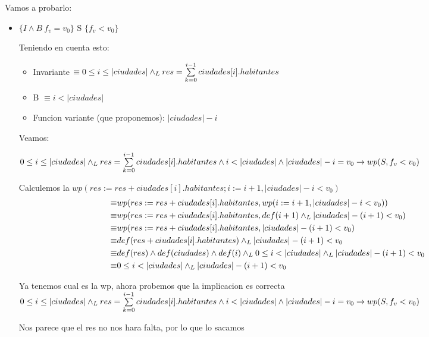 \documentclass[10pt,a4paper]{article}
\begin{document}
\begin {enumerate}
    Vamos a probarlo:

    \begin{itemize}
        \item 
            $\{ I \land B \ f_{v} = v_{0}  \}$ S $\{f_{v} < v_{0}\}$

            Teniendo en cuenta esto: 
            \begin{itemize}
                \item Invariante  $\equiv 0 \leq i \leq |ciudades| \land _L res = \sum\limits_{k=0}^{i - 1}{ciudades[i].habitantes}$
                \item B $ \equiv i < |ciudades|$
                \item Funcion variante (que proponemos): $|ciudades| - i$
            \end{itemize}

            Veamos: 

            $0 \leq i \leq |ciudades| \land _L res = \sum\limits_{k=0}^{i - 1}{ciudades[i].habitantes} \land i < |ciudades| \land |ciudades| - i = v_{0} \to wp(S, f_{v} < v_{0})$
    
    
            Calculemos la $wp(res := res + ciudades[i].habitantes; i := i + 1, |ciudades| - i < v_{0})$
            \begin{align*}
                \equiv &wp(res := res + ciudades[i].habitantes, wp(i := i + 1, |ciudades| - i < v_{0})) \\
                \equiv &wp(res := res + ciudades[i].habitantes, def (i + 1) \land _L |ciudades| - (i + 1) < v_{0}) \\
                \equiv &wp(res := res + ciudades[i].habitantes, |ciudades| - (i + 1) < v_{0}) \\
                \equiv &def(res + ciudades[i].habitantes) \land _L |ciudades| - (i + 1) < v_{0} \\
                \equiv &def(res) \land def(ciudades) \land def(i) \land _L 0 \leq i < |ciudades| \land _L |ciudades| - (i + 1) < v_{0} \\
                \equiv &0 \leq i < |ciudades| \land _L |ciudades| - (i + 1) < v_{0}
            \end{align*}


            Ya tenemos cual es la wp, ahora probemos que la implicacion es correcta
           $ 0 \leq i \leq |ciudades| \land _L res = \sum\limits_{k=0}^{i - 1}{ciudades[i].habitantes} \land i < |ciudades| \land |ciudades| - i = v_{0} \to wp(S, f_{v} < v_{0}) $

        Nos parece que el res no nos hara falta, por lo que lo sacamos


\end{itemize}
\end{enumerate}
\end{document}
